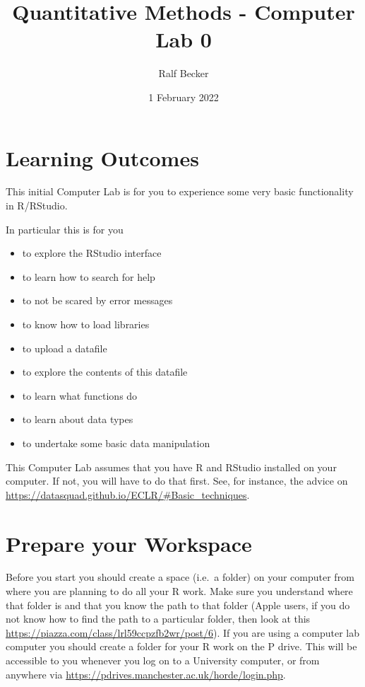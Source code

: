 \documentclass[
]{article}
\title{Quantitative Methods - Computer Lab 0}
\author{Ralf Becker}
\date{1 February 2022}
\providecommand{\tightlist}{%
  \setlength{\itemsep}{0pt}\setlength{\parskip}{0pt}}
\begin{document}
\maketitle

\hypertarget{learning-outcomes}{%
\section{Learning Outcomes}\label{learning-outcomes}}

This initial Computer Lab is for you to experience some very basic
functionality in R/RStudio.

In particular this is for you

\begin{itemize}
\tightlist
\item
  to explore the RStudio interface
\item
  to learn how to search for help
\item
  to not be scared by error messages
\item
  to know how to load libraries
\item
  to upload a datafile
\item
  to explore the contents of this datafile
\item
  to learn what functions do
\item
  to learn about data types
\item
  to undertake some basic data manipulation
\end{itemize}

This Computer Lab assumes that you have R and RStudio installed on your
computer. If not, you will have to do that first. See, for instance, the
advice on
\href{ECLR}{https://datasquad.github.io/ECLR/\#Basic\_techniques}.

\hypertarget{prepare-your-workspace}{%
\section{Prepare your Workspace}\label{prepare-your-workspace}}

Before you start you should create a space (i.e.~a folder) on your
computer from where you are planning to do all your R work. Make sure
you understand where that folder is and that you know the path to that
folder (Apple users, if you do not know how to find the path to a
particular folder, then look at this
\href{Piazza\%20post}{https://piazza.com/class/lrl59ccpzfb2wr/post/6}).
If you are using a computer lab computer you should create a folder for
your R work on the P drive. This will be accessible to you whenever you
log on to a University computer, or from anywhere via
\href{this\%20link}{https://pdrives.manchester.ac.uk/horde/login.php}.
\end{document}
